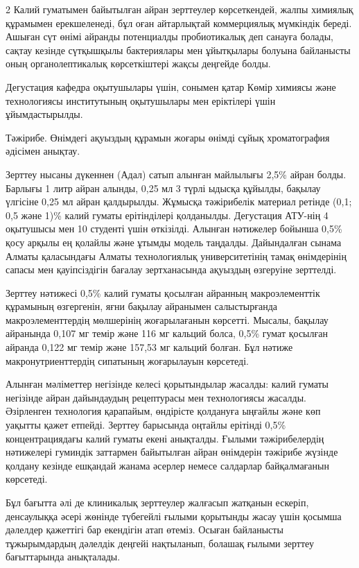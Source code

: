 \begin{multicols}{2}
Калий гуматымен байытылған айран зерттеулер көрсеткендей, жалпы химиялық
құрамымен ерекшеленеді, бұл оған айтарлықтай коммерциялық мүмкіндік
береді. Ашыған сүт өнімі айранды потенциалды пробиотикалық деп санауға
болады, сақтау кезінде сүтқышқылы бактериялары мен ұйытқылары болуына
байланысты оның органолептикалық көрсеткіштері жақсы деңгейде болды.

Дегустация кафедра оқытушылары үшін, сонымен қатар Көмір химиясы және
технологиясы институтының оқытушылары мен еріктілері үшін
ұйымдастырылды.

Тәжірибе. Өнімдегі ақуыздың құрамын жоғары өнімді сұйық хроматография
әдісімен анықтау.

Зерттеу нысаны дүкеннен (Адал) сатып алынған майлылығы 2,5\% айран
болды. Барлығы 1 литр айран алынды, 0,25 мл 3 түрлі ыдысқа құйылды,
бақылау үлгісіне 0,25 мл айран қалдырылды. Жұмысқа тәжірибелік материал
ретінде (0,1; 0,5 және 1)\% калий гуматы ерітінділері қолданылды.
Дегустация АТУ-нің 4 оқытушысы мен 10 студенті үшін өткізілді. Алынған
нәтижелер бойынша 0,5\% қосу арқылы ең қолайлы және ұтымды модель
таңдалды. Дайындалған сынама Алматы қаласындағы Алматы технологиялық
университетінің тамақ өнімдерінің сапасы мен қауіпсіздігін бағалау
зертханасында ақуыздың өзгеруіне зерттелді.

Зерттеу нәтижесі 0,5\% калий гуматы қосылған айранның макроэлементтік
құрамының өзгергенін, яғни бақылау айранымен салыстырғанда
макроэлементтердің мөлшерінің жоғарылағанын көрсетті. Мысалы, бақылау
айранында 0,107 мг темір және 116 мг кальций болса, 0,5\% гумат қосылған
айранда 0,122 мг темір және 157,53 мг кальций болған. Бұл нәтиже
макронутриенттердің сипатының жоғарылауын көрсетеді.

Алынған мәліметтер негізінде келесі қорытындылар жасалды: калий гуматы
негізінде айран дайындаудың рецептурасы мен технологиясы жасалды.
Әзірленген технология қарапайым, өндірісте қолдануға ыңғайлы және көп
уақытты қажет етпейді. Зерттеу барысында оңтайлы ерітінді 0,5\%
концентрациядағы калий гуматы екені анықталды. Ғылыми тәжірибелердің
нәтижелері гуминдік заттармен байытылған айран өнімдерін тәжірибе
жүзінде қолдану кезінде ешқандай жанама әсерлер немесе салдарлар
байқалмағанын көрсетеді.

Бұл бағытта әлі де клиникалық зерттеулер жалғасып жатқанын ескеріп,
денсаулыққа әсері жөнінде түбегейлі ғылыми қорытынды жасау үшін қосымша
дәлелдер қажеттігі бар екендігін атап өтеміз. Осыған байланысты
тұжырымдардың дәлелдік деңгейі нақтыланып, болашақ ғылыми зерттеу
бағыттарында анықталады.


\end{multicols}
